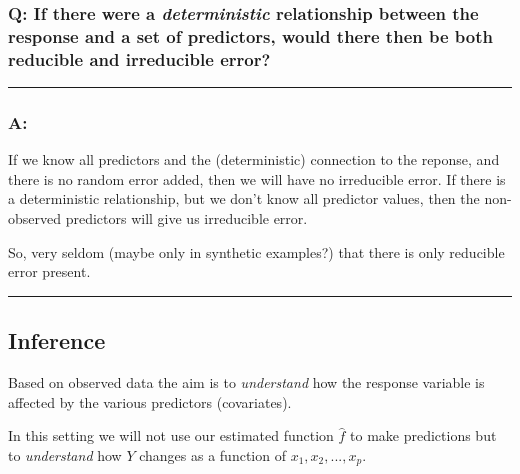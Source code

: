 \documentclass[]{article}
\begin{document}
\hypertarget{q-if-there-were-a-deterministic-relationship-between-the-response-and-a-set-of-predictors-would-there-then-be-both-reducible-and-irreducible-error}{%
\subsubsection{\texorpdfstring{Q: If there were a \emph{deterministic}
relationship between the response and a set of predictors, would there
then be both reducible and irreducible
error?}{Q: If there were a deterministic relationship between the response and a set of predictors, would there then be both reducible and irreducible error?}}\label{q-if-there-were-a-deterministic-relationship-between-the-response-and-a-set-of-predictors-would-there-then-be-both-reducible-and-irreducible-error}}

\begin{center}\rule{0.5\linewidth}{\linethickness}\end{center}

\hypertarget{a-1}{%
\subsubsection{A:}\label{a-1}}

If we know all predictors and the (deterministic) connection to the
reponse, and there is no random error added, then we will have no
irreducible error. If there is a deterministic relationship, but we
don't know all predictor values, then the non-observed predictors will
give us irreducible error.

So, very seldom (maybe only in synthetic examples?) that there is only
reducible error present.

\begin{center}\rule{0.5\linewidth}{\linethickness}\end{center}

\hypertarget{inference}{%
\subsection{Inference}\label{inference}}

Based on observed data the aim is to \emph{understand} how the response
variable is affected by the various predictors (covariates).

In this setting we will not use our estimated function \(\hat{f}\) to
make predictions but to \emph{understand} how \(Y\) changes as a
function of \(x_1, x_2, ..., x_p\).
\end{document}
